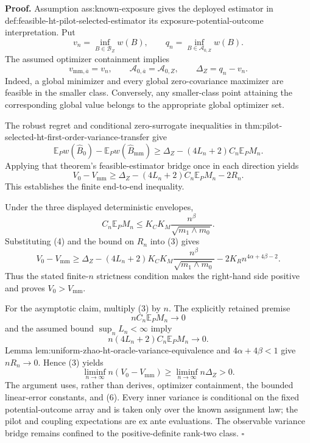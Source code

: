 \textbf{Proof.}
Assumption ass:known-exposure gives the deployed estimator in def:feasible-ht-pilot-selected-estimator its exposure-potential-outcome interpretation.  Put
\[
v_n=\inf_{B\in\mathcal B_Z}w(B),
\qquad
q_n=\inf_{B\in\mathcal A_{0,Z}}w(B).
\]
The assumed optimizer containment implies
\[
v_{\mathrm{mm},\overline a}=v_n,
\qquad
\mathcal A_{0,\overline a}=\mathcal A_{0,Z},
\qquad
\Delta_Z=q_n-v_n.
\tag{1}
\]
Indeed, a global minimizer and every global zero-covariance maximizer are feasible in the smaller class.  Conversely, any smaller-class point attaining the corresponding global value belongs to the appropriate global optimizer set.

The robust regret and conditional zero-surrogate inequalities in thm:pilot-selected-ht-first-order-variance-transfer give
\[
\mathbb E_Pw(\widehat B_0)-\mathbb E_Pw(\widehat B_{\mathrm{mm}})
\ge\Delta_Z-(4L_n+2)C_n\mathbb E_PM_n.
\tag{2}
\]
Applying that theorem's feasible-estimator bridge once in each direction yields
\[
V_0-V_{\mathrm{mm}}
\ge\Delta_Z-(4L_n+2)C_n\mathbb E_PM_n-2R_n.
\tag{3}
\]
This establishes the finite end-to-end inequality.

Under the three displayed deterministic envelopes,
\[
C_n\mathbb E_PM_n
\le K_CK_M\frac{n^\beta}{\sqrt{m_1\wedge m_0}}.
\tag{4}
\]
Substituting (4) and the bound on \(R_n\) into (3) gives
\[
V_0-V_{\mathrm{mm}}
\ge \Delta_Z
-(4L_n+2)K_CK_M\frac{n^\beta}{\sqrt{m_1\wedge m_0}}
-2K_Rn^{4\alpha+4\beta-2}.
\tag{5}
\]
Thus the stated finite-\(n\) strictness condition makes the right-hand side positive and proves \(V_0>V_{\mathrm{mm}}\).

For the asymptotic claim, multiply (3) by \(n\).  The explicitly retained premise
\[
nC_n\mathbb E_PM_n\longrightarrow0
\tag{6}
\]
and the assumed bound \(\sup_nL_n<\infty\) imply
\[
n(4L_n+2)C_n\mathbb E_PM_n\longrightarrow0.
\tag{7}
\]
Lemma lem:uniform-zhao-ht-oracle-variance-equivalence and \(4\alpha+4\beta<1\) give \(nR_n\to0\).  Hence (3) yields
\[
\liminf_{n\to\infty}n(V_0-V_{\mathrm{mm}})
\ge\liminf_{n\to\infty}n\Delta_Z>0.
\]
The argument uses, rather than derives, optimizer containment, the bounded linear-error constants, and (6).  Every inner variance is conditional on the fixed potential-outcome array and is taken only over the known assignment law; the pilot and coupling expectations are ex ante evaluations.  The observable variance bridge remains confined to the positive-definite rank-two class. \(\square\)